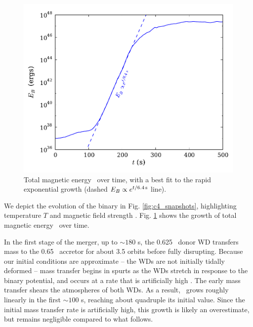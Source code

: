 \begin{figure}
\centering
\includegraphics[angle=0,width=0.7\columnwidth]{chapter4_zhu+15/figures/bgrowth.pdf}
\caption{Total magnetic energy \EB\ over time, with a best fit to the rapid exponential growth (dashed $\EB \propto e^{t/6.4\,\mrm{s}}$ line).}
\label{fig:c4_bgrowth}
\end{figure}

We depict the evolution of the binary in Fig. \ref{fig:c4_snapshots}, highlighting temperature $T$ and magnetic field strength \Bmag.  Fig. \ref{fig:c4_bgrowth} shows the growth of total magnetic energy \EB\ over time.

In the first stage of the merger, up to $\sim180$ s, the 0.625 \Msun\ donor WD transfers mass to the 0.65 \Msun\ accretor for about 3.5 orbits before fully disrupting.  Because our initial conditions are approximate -- the WDs are not initially tidally deformed -- mass transfer begins in spurts as the WDs stretch in response to the binary potential, and occurs at a rate that is artificially high \citep{dan+11}.  The early mass transfer shears the atmospheres of both WDs.  As a result, \EB\ grows roughly linearly in the first $\sim100$ s, reaching about quadruple its initial value.  Since the initial mass transfer rate is artificially high, this growth is likely an overestimate, but remains negligible compared to what follows.


